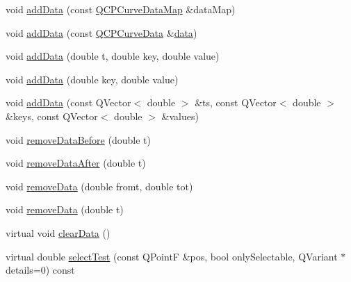 \begin{DoxyCompactItemize}
\item 
void \hyperlink{class_q_c_p_curve_a4e24023c3b9ac75440c7a260172c99af}{add\+Data} (const \hyperlink{qcustomplot_8h_a444d37ec9cb2951b3a7fe443c34d1658}{Q\+C\+P\+Curve\+Data\+Map} \&data\+Map)
\item 
void \hyperlink{class_q_c_p_curve_ad304326aba096911f92452d8bfe0470e}{add\+Data} (const \hyperlink{class_q_c_p_curve_data}{Q\+C\+P\+Curve\+Data} \&\hyperlink{class_q_c_p_curve_a9ac194d35d4f334923aac9df1bf599ca}{data})
\item 
void \hyperlink{class_q_c_p_curve_a13398b236f6926014e404eeb5b9f415c}{add\+Data} (double t, double key, double value)
\item 
void \hyperlink{class_q_c_p_curve_ada4762e793cd5707b33f35b8a4b0f8fb}{add\+Data} (double key, double value)
\item 
void \hyperlink{class_q_c_p_curve_a27c8b3dddd4067d626397ee199626722}{add\+Data} (const Q\+Vector$<$ double $>$ \&ts, const Q\+Vector$<$ double $>$ \&keys, const Q\+Vector$<$ double $>$ \&values)
\item 
void \hyperlink{class_q_c_p_curve_af6f4284fbc2f34e676f24dce03c34fe5}{remove\+Data\+Before} (double t)
\item 
void \hyperlink{class_q_c_p_curve_a0365cb947c4e6d405ee22e00191d5f52}{remove\+Data\+After} (double t)
\item 
void \hyperlink{class_q_c_p_curve_ad45bb5479be799163028ef2b776f7221}{remove\+Data} (double fromt, double tot)
\item 
void \hyperlink{class_q_c_p_curve_a30c91acfa591ec534c49fed4c0fca39a}{remove\+Data} (double t)
\item 
virtual void \hyperlink{class_q_c_p_curve_ae0462c61dbfbac07db0736ec64110241}{clear\+Data} ()
\item 
virtual double \hyperlink{class_q_c_p_curve_a5af9949e725704811bbc81ecd5970b8e}{select\+Test} (const Q\+Point\+F \&pos, bool only\+Selectable, Q\+Variant $\ast$details=0) const 
\end{DoxyCompactItemize}
